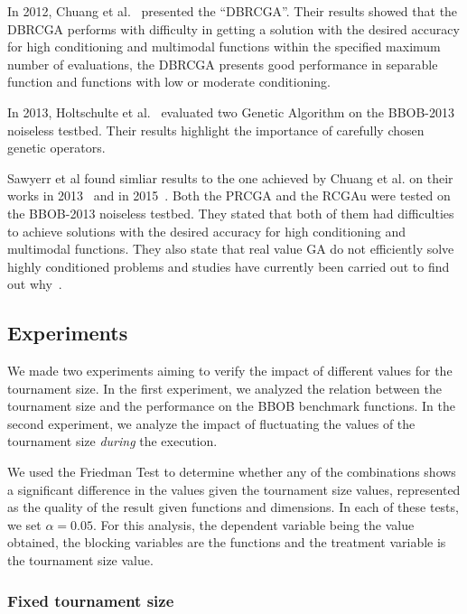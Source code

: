 In 2012, Chuang et al.~\cite{chuang2012black} presented the ``DBRCGA''. Their results showed that the DBRCGA performs with difficulty in getting a solution with the desired accuracy for high conditioning and multimodal functions within the specified maximum number of evaluations, the DBRCGA presents good performance in separable function and functions with low or moderate conditioning.

In 2013, Holtschulte et al.~\cite{holtschulte2013benchmarking} evaluated two Genetic Algorithm on the BBOB-2013 noiseless testbed. Their results highlight the importance of carefully chosen genetic operators.

Sawyerr et al found simliar results to the one achieved by Chuang et al. on their works in 2013~\cite{sawyerr2013benchmarking} and in 2015~\cite{sawyerr2015benchmarking}. Both the PRCGA and the RCGAu were tested on the BBOB-2013 noiseless testbed. They stated that both of them had difficulties to achieve solutions with the desired accuracy for high conditioning and multimodal functions. They also state that real value GA do not efficiently solve highly conditioned problems and studies have currently been carried out to find out why~\cite{sawyerr2015benchmarking}.




\label{sec:experiment}

\subsection{Experiments}
We made two experiments aiming to verify the impact of different values for the tournament size. In the first experiment, we analyzed the relation between the tournament size and the performance on the BBOB benchmark functions. In the second experiment, we analyze the impact of fluctuating the values of the tournament size \textit{during} the execution.

We used the Friedman Test to determine whether any of the combinations shows a
significant difference in the values given the tournament size values, represented as the
quality of the result given functions and dimensions. In each of these tests, we set
$\alpha = 0.05$. For this analysis, the dependent variable being the value obtained, the blocking variables are the functions and the treatment variable is the tournament size value.

\subsubsection*{Fixed tournament size}


